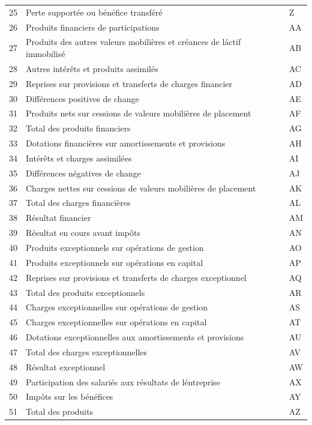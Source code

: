 \documentclass[mstat,12pt]{unswthesis}
\begin{document}
\begin{longtable}{|p{0.7cm}|p{12cm}|p{1.5cm}|}
25 & Perte support\'ee ou b\'en\'efice transf\'er\'e & Z \\
26 & Produits financiers de participations & AA \\
27 & Produits des autres valeurs mobili\`eres et cr\'eances de l\'actif immobilis\'e & AB \\
28 & Autres int\'er\^ets et produits assimil\'es & AC \\
29 & Reprises sur provisions et transferts de charges financier & AD \\
30 & Diff\'erences positives de change & AE \\
31 & Produits nets sur cessions de valeurs mobili\`eres de placement & AF \\
32 & Total des produits financiers & AG \\
33 & Dotations financi\`eres sur amortissements et provisions & AH \\
34 & Int\'er\^ets et charges assimil\'ees & AI \\
35 & Diff\'erences n\'egatives de change & AJ \\
36 & Charges nettes sur cessions de valeurs mobili\`eres de placement & AK \\
37 & Total des charges financi\`eres & AL \\
38 & R\'esultat financier & AM \\
39 & R\'esultat en cours avant imp\^ots & AN \\
40 & Produits exceptionnels sur op\'erations de gestion & AO \\
41 & Produits exceptionnels sur op\'erations en capital & AP \\
42 & Reprises sur provisions et transferts de charges exceptionnel & AQ \\
43 & Total des produits exceptionnels & AR \\
44 & Charges exceptionnelles sur op\'erations de gestion & AS \\
45 & Charges exceptionnelles sur op\'erations en capital & AT \\
46 & Dotations exceptionnelles aux amortissements et provisions & AU \\
47 & Total des charges exceptionnelles & AV \\
48 & R\'esultat exceptionnel & AW \\
49 & Participation des salari\'es aux r\'esultats de l\'entreprise & AX \\
50 & Imp\^ots sur les b\'en\'efices & AY \\
51 & Total des produits & AZ \\

\end{longtable}
\end{document}
